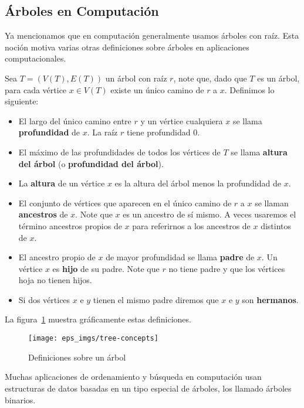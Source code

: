 \subsection{Árboles en Computación}

Ya mencionamos que en computación generalmente usamos árboles con raíz.
Esta noción motiva varias otras definiciones sobre árboles en aplicaciones computacionales.

\begin{definicion}
Sea $T=(V(T),E(T))$ un árbol con raíz $r$, note que, dado que $T$ es un árbol, para cada vértice $x\in V(T)$ existe un único camino de $r$ a $x$.
Definimos lo siguiente:
\begin{itemize}
  \itemsep 0pt
  \item El largo del único camino entre $r$ y un vértice cualquiera $x$ se llama {\bf profundidad} de $x$.
  La raíz $r$ tiene profundidad $0$.
  \item El máximo de las profundidades de todos los vértices de $T$ se llama {\bf altura del árbol} (o {\bf profundidad del árbol}).
  \item La {\bf altura} de un vértice $x$ es la altura del árbol menos la profundidad de $x$.
  \item El conjunto de vértices que aparecen en el único camino de $r$ a $x$ se llaman {\bf ancestros} de $x$.
  Note que $x$ es un ancestro de sí mismo.
  A veces usaremos el término ancestros propios de $x$  para referirnos a los ancestros de $x$ distintos de $x$.
  \item El ancestro propio de $x$ de mayor profundidad se llama {\bf padre} de $x$. 
  Un vértice $x$ es {\bf hijo} de su padre.
  Note que $r$ no tiene padre y que los vértices hoja no tienen hijos.
  \item Si dos vértices $x$ e $y$ tienen el mismo padre diremos que $x$ e $y$ son {\bf hermanos}.
\end{itemize}
La figura~\ref{fig:tree-concepts} muestra gráficamente estas definiciones.

\begin{figure}[h!]
\centering
\texttt{[image: eps\_imgs/tree-concepts]}
\caption{Definiciones sobre un árbol}
\label{fig:tree-concepts}
\end{figure}
\end{definicion}

Muchas aplicaciones de ordenamiento y búsqueda en computación usan estructuras de datos basadas en un tipo especial de árboles, los llamado árboles binarios.

